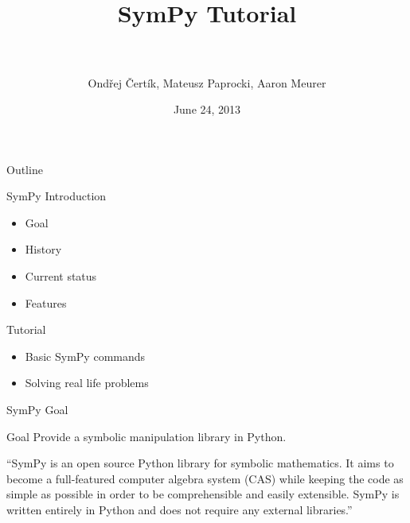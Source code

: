 \documentclass[xcolor=svgnames]{beamer}
\title[SymPy\hspace{4em}\insertframenumber/
\inserttotalframenumber]{~\\ SymPy Tutorial \\~}
\author[O. Čertík, M. Paprocki, A. Meurer]
{Ondřej Čertík, Mateusz Paprocki, Aaron Meurer}
\institute{\pgfuseimage{mylogo}}
\date{June 24, 2013}
\begin{document}
\begin{frame}
  \maketitle
\end{frame}

\begin{frame}{Outline}
  \begin{block}{SymPy Introduction}
    \begin{itemize}
    \item Goal
    \item History
    \item Current status
    \item Features
    \end{itemize}
  \end{block}

  \begin{block}{Tutorial}
    \begin{itemize}
    \item Basic SymPy commands
    \item Solving real life problems
    \end{itemize}
  \end{block}
\end{frame}

\begin{frame}{SymPy Goal}
  \begin{block}{Goal}
    Provide a symbolic manipulation library in Python.
  \end{block}
  \pause
  \begin{block}

    ``SymPy is an open source Python library for symbolic mathematics. It aims to
    become a full-featured computer algebra system (CAS) while keeping the code as
    simple as possible in order to be comprehensible and easily extensible. SymPy
    is written entirely in Python and does not require any external libraries.''

  \end{block}
\end{frame}
\end{document}
